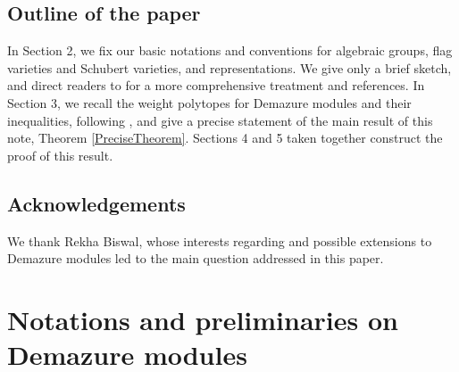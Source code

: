 \documentclass[12pt,reqno]{amsart}
\theoremstyle{definition}
\begin{document}
\subsection{Outline of the paper}
In Section 2, we fix our basic notations and conventions for algebraic groups, flag varieties and Schubert varieties, and representations. We give only a brief sketch, and direct readers to \cite{KumarBook} for a more comprehensive treatment and references. In Section 3, we recall the weight polytopes for Demazure modules and their inequalities, following \cite{BJK2, BJK3}, and give a precise statement of the main result of this note, Theorem \ref{PreciseTheorem}. Sections 4 and 5 taken together construct the proof of this result. 




\subsection{Acknowledgements}

We thank Rekha Biswal, whose interests regarding \cite{BJK4} and possible extensions to Demazure modules led to the main question addressed in this paper. 








\section{Notations and preliminaries on Demazure modules} \label{Notation}
\end{document}
